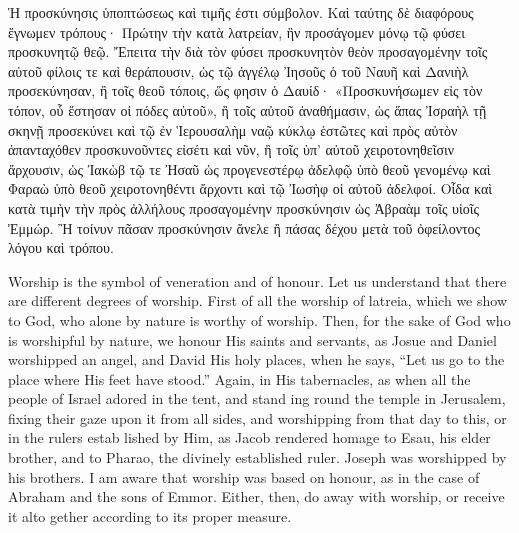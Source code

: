 \documentclass[10pt]{book}
\newcommand{\switchgreek}[1][]{\selectlanguage{polutonikogreek} \switchcolumn*[#1]}
\newcommand{\switchenglish}{\selectlanguage{english} \switchcolumn}
\begin{document}
\begin{paracol}{2}
\switchgreek

Ἡ προσκύνησις ὑποπτώσεως καὶ τιμῆς ἐστι σύμβολον. Καὶ ταύτης δὲ διαφόρους ἔγνωμεν τρόπους· Πρώτην τὴν κατὰ λατρείαν, ἣν προσάγομεν μόνῳ τῷ φύσει προσκυνητῷ θεῷ. Ἔπειτα τὴν διὰ τὸν φύσει προσκυνητὸν θεὸν προσαγομένην τοῖς αὐτοῦ φίλοις τε καὶ θεράπουσιν, ὡς τῷ ἀγγέλῳ Ἰησοῦς ὁ τοῦ Ναυῆ καὶ Δανιὴλ προσεκύνησαν, ἢ τοῖς θεοῦ τόποις, ὥς φησιν ὁ Δαυίδ· «Προσκυνήσωμεν εἰς τὸν τόπον, οὗ ἔστησαν οἱ πόδες αὐτοῦ», ἢ τοῖς αὐτοῦ ἀναθήμασιν, ὡς ἅπας Ἰσραὴλ τῇ σκηνῇ προσεκύνει καὶ τῷ ἐν Ἱερουσαλὴμ ναῷ κύκλῳ ἑστῶτες καὶ πρὸς αὐτὸν ἁπανταχόθεν προσκυνοῦντες εἰσέτι καὶ νῦν, ἢ τοῖς ὑπ’ αὐτοῦ χειροτονηθεῖσιν ἄρχουσιν, ὡς Ἰακὼβ τῷ τε Ἠσαῦ ὡς προγενεστέρῳ ἀδελφῷ ὑπὸ θεοῦ γενομένῳ καὶ Φαραὼ ὑπὸ θεοῦ χειροτονηθέντι ἄρχοντι καὶ τῷ Ἰωσὴφ οἱ αὐτοῦ ἀδελφοί. Οἶδα καὶ κατὰ τιμὴν τὴν πρὸς ἀλλήλους προσαγομένην προσκύνησιν ὡς Ἀβραὰμ τοῖς υἱοῖς Ἐμμώρ. Ἢ τοίνυν πᾶσαν προσκύνησιν ἄνελε ἢ πάσας δέχου μετὰ τοῦ ὀφείλοντος λόγου καὶ τρόπου.

\switchenglish

Worship is the symbol of veneration and of 
honour. Let us understand that there are 
different degrees of worship. First of all the 
worship of latreia, which we show to God, who 
alone by nature is worthy of worship. Then, 
for the sake of God who is worshipful by 
nature, we honour His saints and servants, as 
Josue and Daniel worshipped an angel, and 
David His holy places, when he says, ``Let 
us go to the place where His feet have stood.'' 
Again, in His tabernacles, as when all the 
people of Israel adored in the tent, and stand 
ing round the temple in Jerusalem, fixing their 
gaze upon it from all sides, and worshipping 
from that day to this, or in the rulers estab 
lished by Him, as Jacob rendered homage to 
Esau, his elder brother, and to Pharao, the 
divinely established ruler. Joseph was worshipped by his brothers. I am aware that 
worship was based on honour, as in the case 
of Abraham and the sons of Emmor. Either, 
then, do away with worship, or receive it alto 
gether according to its proper measure. 

\switchgreek


\end{paracol}
\end{document}
